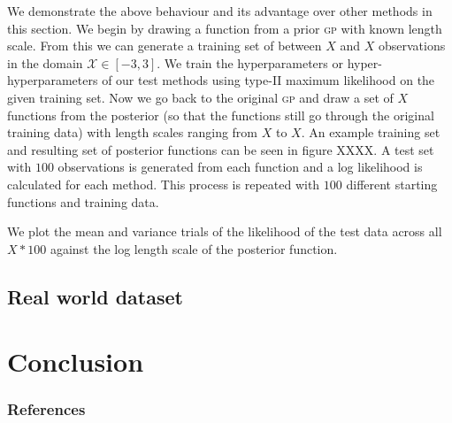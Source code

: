 \documentclass{article}
\renewcommand{\sc}[1]{{\scshape #1}}
\begin{document}
We demonstrate the above behaviour and its advantage over other methods in this section. We begin by drawing a function from a prior \sc{gp} with known length scale. From this we can generate a training set of between $X$ and $X$ observations in the domain $\mathcal{X}\in [-3,3]$. We train the hyperparameters or hyper-hyperparameters of our test methods using type-II maximum likelihood on the given training set. Now we go back to the original \sc{gp} and draw a set of $X$ functions from the posterior (so that the functions still go through the original training data) with length scales ranging from $X$ to $X$. An example training set and resulting set of posterior functions can be seen in figure XXXX. A test set with $100$ observations is generated from each function and a log likelihood is calculated for each method. This process is repeated with $100$ different starting functions and training data.

We plot the mean and variance trials of the likelihood of the test data across all $X*100$ against the log length scale of the posterior function.




\subsection{Real world dataset}














\section{Conclusion}





\subsubsection*{References}
\renewcommand{\refname}{\vskip -0.75cm}  %

\small{

}
\end{document}
